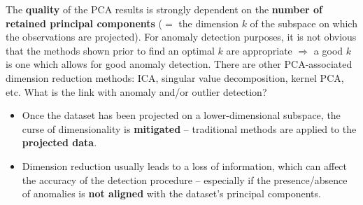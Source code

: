 \documentclass[20pt,landscape,footrule,headrule]{foils}
\newcommand{\newl}{\newline\newline}
\begin{document}
{{%
\noindent The \textbf{quality} of the PCA results is strongly dependent on the \textbf{number of retained principal components} ($=$ the dimension $k$ of the subspace on which the observations are projected). \newl For anomaly detection purposes, it is not obvious that the methods shown prior to find an optimal $k$ are appropriate $\Longrightarrow$ a good $k$ is one which allows for good anomaly detection. 
\newl \noindent There are other PCA-associated dimension reduction methods: ICA, singular value decomposition, kernel PCA, etc.  \newl What is the link with anomaly and/or outlier detection? 
\begin{itemize}
\item Once the dataset has been projected on a lower-dimensional subspace, the curse of dimensionality is \textbf{mitigated} -- traditional methods are applied to the \textbf{projected data}.
\item  Dimension reduction usually leads to a loss of information, which can affect the accuracy of the detection procedure -- especially if the presence/absence of anomalies is \textbf{not aligned} with the dataset's principal components. 

\end{itemize}}}
\end{document}
